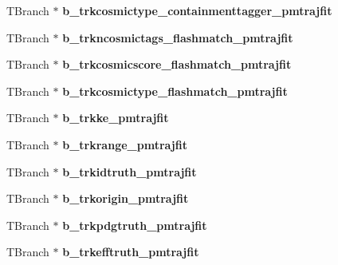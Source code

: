 \begin{DoxyCompactItemize}
\item 
\hypertarget{classanatree_a1fa7878ea1a693f4881989480cda2414}{T\-Branch $\ast$ {\bfseries b\-\_\-trkcosmictype\-\_\-containmenttagger\-\_\-pmtrajfit}}\label{classanatree_a1fa7878ea1a693f4881989480cda2414}

\item 
\hypertarget{classanatree_a102fec579615dd3c32ffc3af660db375}{T\-Branch $\ast$ {\bfseries b\-\_\-trkncosmictags\-\_\-flashmatch\-\_\-pmtrajfit}}\label{classanatree_a102fec579615dd3c32ffc3af660db375}

\item 
\hypertarget{classanatree_a2f607a0a29a2e7eaaefad1255c36f378}{T\-Branch $\ast$ {\bfseries b\-\_\-trkcosmicscore\-\_\-flashmatch\-\_\-pmtrajfit}}\label{classanatree_a2f607a0a29a2e7eaaefad1255c36f378}

\item 
\hypertarget{classanatree_a97ff55d779c97fcb01671ebc648a5a2b}{T\-Branch $\ast$ {\bfseries b\-\_\-trkcosmictype\-\_\-flashmatch\-\_\-pmtrajfit}}\label{classanatree_a97ff55d779c97fcb01671ebc648a5a2b}

\item 
\hypertarget{classanatree_ac6d21bd2aa391cbe593b3a8d60e9d75b}{T\-Branch $\ast$ {\bfseries b\-\_\-trkke\-\_\-pmtrajfit}}\label{classanatree_ac6d21bd2aa391cbe593b3a8d60e9d75b}

\item 
\hypertarget{classanatree_ad06f3f694380e0595b922f65a2a08f8c}{T\-Branch $\ast$ {\bfseries b\-\_\-trkrange\-\_\-pmtrajfit}}\label{classanatree_ad06f3f694380e0595b922f65a2a08f8c}

\item 
\hypertarget{classanatree_a1af9561a17956088cedad9486480d01c}{T\-Branch $\ast$ {\bfseries b\-\_\-trkidtruth\-\_\-pmtrajfit}}\label{classanatree_a1af9561a17956088cedad9486480d01c}

\item 
\hypertarget{classanatree_a97902af9fabebff2666c6946e86da22d}{T\-Branch $\ast$ {\bfseries b\-\_\-trkorigin\-\_\-pmtrajfit}}\label{classanatree_a97902af9fabebff2666c6946e86da22d}

\item 
\hypertarget{classanatree_ad99bb6a5f890d8e503485828be98a96d}{T\-Branch $\ast$ {\bfseries b\-\_\-trkpdgtruth\-\_\-pmtrajfit}}\label{classanatree_ad99bb6a5f890d8e503485828be98a96d}

\item 
\hypertarget{classanatree_ac1d4fc90c60034641aec255b90304853}{T\-Branch $\ast$ {\bfseries b\-\_\-trkefftruth\-\_\-pmtrajfit}}\label{classanatree_ac1d4fc90c60034641aec255b90304853}


\end{DoxyCompactItemize}
